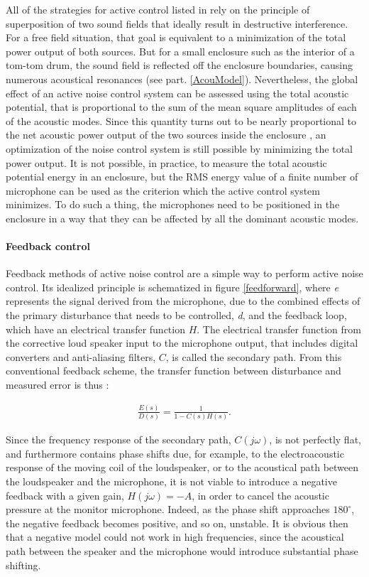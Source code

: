 \documentclass[11pt, twocolumn]{article}
\begin{document}
 All of the strategies for active control listed in \cite{248551} rely on the principle of superposition of two sound fields that ideally result in destructive interference. For a free field situation, that goal is equivalent to a minimization of the total power output of both sources. But for a small enclosure such as the interior of a tom-tom drum, the sound field is reflected off the enclosure boundaries, causing numerous acoustical resonances (see part. \ref{AcouModel}). Nevertheless, the global effect of an active noise control system can be assessed using the total acoustic potential, that is proportional to the sum of the mean square amplitudes of each of the acoustic modes. Since this quantity turns out to be nearly proportional to the net acoustic power output of the two sources inside the enclosure \cite{elliototo}, an optimization of the noise control system is still possible by minimizing the total power output. It is not possible, in practice, to measure the total acoustic potential energy in an enclosure, but the RMS energy value of a finite number of microphone can be used as the criterion which the active control system minimizes. To do such a thing, the microphones need to be positioned in the enclosure in a way that they can be affected by all the dominant acoustic modes. 
 
 \paragraph{Feedback control}
 
 Feedback methods of active noise control are a simple way to perform active noise control. Its idealized principle is schematized in figure \ref{feedforward}, where \textit{e} represents the signal derived from the microphone, due to the combined effects of the primary disturbance that needs to be controlled, \textit{d}, and the feedback loop, which have an electrical transfer function $H$. The electrical transfer function from the corrective loud speaker input to the microphone output, that includes digital converters and anti-aliasing filters, $C$, is called the secondary path. From this conventional feedback scheme, the transfer function between disturbance and measured error is thus : 
 
 \begin{align}
     \frac{E(s)}{D(s)} = \frac{1}{1 - C(s)H(s)}.
 \end{align}
 
 \noindent
 Since the frequency response of the secondary path, $C(j\omega)$, is not perfectly flat, and furthermore contains phase shifts due, for example, to the electroacoustic response of the moving coil of the loudspeaker, or to the acoustical path between the loudspeaker and the microphone, it is not viable to introduce a negative feedback with a given gain, $H(j\omega) = -A$, in order to cancel the acoustic pressure at the monitor microphone. Indeed, as the phase shift approaches $180^\circ$, the negative feedback becomes positive, and so on, unstable. It is obvious then that a negative model could not work in high frequencies, since the acoustical path between the speaker and the microphone would introduce substantial phase shifting. 
 
\end{document}
